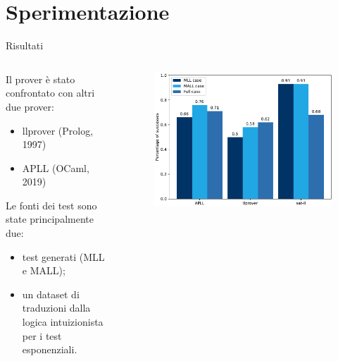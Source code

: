 \documentclass{beamer}
\begin{document}
\section{Sperimentazione}
\begin{frame}{Risultati}
	\begin{columns}
		\begin{column}{.5\textwidth}
			Il prover è stato confrontato con altri due prover:
			\begin{itemize}
				\item llprover (Prolog, 1997)
				\item APLL (OCaml, 2019)
			\end{itemize}
			Le fonti dei test sono state principalmente due:
			\begin{itemize}
				\item test generati (MLL e MALL);
				\item un dataset di traduzioni dalla logica intuizionista per i test esponenziali.
			\end{itemize}
		\end{column}
		\begin{column}{.5\textwidth}
			\begin{figure}[H]
				\centering
				\includegraphics[scale=.4]{images/graph}
			\end{figure}
		\end{column}
	\end{columns}
\end{frame}
\end{document}
